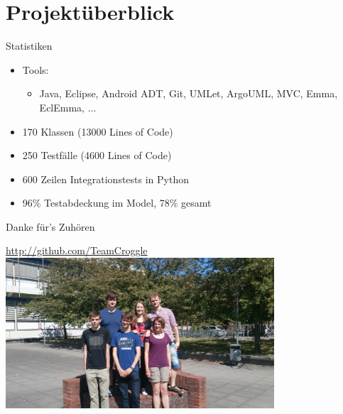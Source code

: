 \section{Projektüberblick}

\begin{frame}{Statistiken}
	\begin{itemize}
		\item Tools:
		\begin{itemize}
			\item Java, Eclipse, Android ADT, Git, UMLet, ArgoUML, MVC, Emma, EclEmma, ...
		\end{itemize}
		\item 170 Klassen (13000 Lines of Code)
		\item 250 Testfälle (4600 Lines of Code)
		\item 600 Zeilen Integrationstests in Python
		\item 96\% Testabdeckung im Model, 78\% gesamt
	\end{itemize}
\end{frame}

\begin{frame}{Danke für's Zuhören}
	\begin{center}
		\textcolor{blue}{\href{http://github.com/TeamCroggle}{http://github.com/TeamCroggle}}
		\includegraphics[width=10cm,type=jpg,ext=.jpg,read=.jpg]{media/2014-06-24 10.56.29}
	\end{center}
\end{frame}
